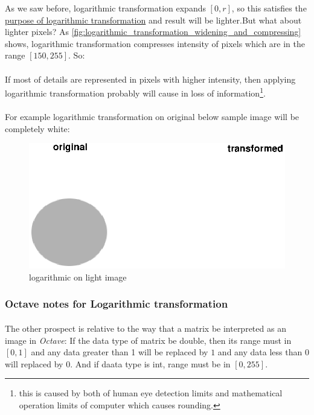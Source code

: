 As we saw before, logarithmic transformation expands $[0,r]$, so this satisfies
the \hyperref[purpose_of_logarithmic_transformation] {purpose of logarithmic
transformation} and result will be lighter.But what about lighter pixels? As \autoref{fig:logarithmic_transformation_widening_and_compressing} shows, 
logarithmic transformation compresses intensity of pixels which are in the range $[150,255]$. So:

\paragraph*{}\care
    If most of details are represented in pixels with higher intensity, then
    applying logarithmic transformation probably will cause in loss of 
    information\footnote{this is caused by both of human eye detection limits 
    and mathematical operation limits of computer which causes rounding.}. 
    
\paragraph{}For example logarithmic transformation on original below sample
image will be completely white:
    \begin{figure}[htb!]
        \includegraphics[scale=0.4]{logarithmic_on_light_image.eps}
        \centering
        \caption{logarithmic on light image}
        \label{fig:logarithmic_on_light_image}
\end{figure}

\subsubsection{Octave notes for Logarithmic transformation}
\label{Octave_notes_for_Logarithmic_transformation}

\paragraph{}The other prospect is relative to the way that a matrix be interpreted as an
image in \emph{Octave}: If the data type of matrix be double, then its range
must in $[0,1]$ and any data greater than 1 will be replaced by $1$ 
and any data less than $0$ will replaced by $0$. And if daata type is int,
range must be in $[0,255]$.

